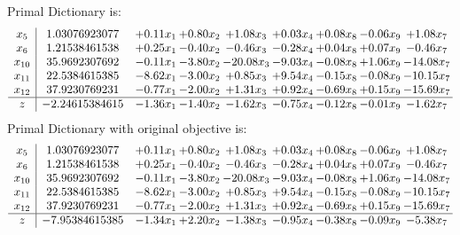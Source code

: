 \documentclass[9pt]{article}
\begin{document}
Primal Dictionary is:
\[\begin{array}{c| c c@{\hskip 2pt} c@{\hskip 2pt} c@{\hskip 2pt} c@{\hskip 2pt} c@{\hskip 2pt} c@{\hskip 2pt} c@{\hskip 2pt} }
 x_{5}   &  1.03076923077 & +  0.11 x_{1} & +  0.80 x_{2} & +  1.08 x_{3} & +  0.03 x_{4} & +  0.08 x_{8} & -0.06 x_{9} & +  1.08 x_{7}\\
 x_{6}   &  1.21538461538 & +  0.25 x_{1} & -0.40 x_{2} & -0.46 x_{3} & -0.28 x_{4} & +  0.04 x_{8} & +  0.07 x_{9} & -0.46 x_{7}\\
 x_{10}   &  35.9692307692 & -0.11 x_{1} & -3.80 x_{2} & -20.08 x_{3} & -9.03 x_{4} & -0.08 x_{8} & +  1.06 x_{9} & -14.08 x_{7}\\
 x_{11}   &  22.5384615385 & -8.62 x_{1} & -3.00 x_{2} & +  0.85 x_{3} & +  9.54 x_{4} & -0.15 x_{8} & -0.08 x_{9} & -10.15 x_{7}\\
 x_{12}   &  37.9230769231 & -0.77 x_{1} & -2.00 x_{2} & +  1.31 x_{3} & +  0.92 x_{4} & -0.69 x_{8} & +  0.15 x_{9} & -15.69 x_{7}\\
\hline
z    &  -2.24615384615 & -1.36 x_{1} & -1.40 x_{2} & -1.62 x_{3} & -0.75 x_{4} & -0.12 x_{8} & -0.01 x_{9} & -1.62 x_{7}\\
\end{array}\]
Primal Dictionary with original objective is:
\[\begin{array}{c| c c@{\hskip 2pt} c@{\hskip 2pt} c@{\hskip 2pt} c@{\hskip 2pt} c@{\hskip 2pt} c@{\hskip 2pt} c@{\hskip 2pt} }
 x_{5}   &  1.03076923077 & +  0.11 x_{1} & +  0.80 x_{2} & +  1.08 x_{3} & +  0.03 x_{4} & +  0.08 x_{8} & -0.06 x_{9} & +  1.08 x_{7}\\
 x_{6}   &  1.21538461538 & +  0.25 x_{1} & -0.40 x_{2} & -0.46 x_{3} & -0.28 x_{4} & +  0.04 x_{8} & +  0.07 x_{9} & -0.46 x_{7}\\
 x_{10}   &  35.9692307692 & -0.11 x_{1} & -3.80 x_{2} & -20.08 x_{3} & -9.03 x_{4} & -0.08 x_{8} & +  1.06 x_{9} & -14.08 x_{7}\\
 x_{11}   &  22.5384615385 & -8.62 x_{1} & -3.00 x_{2} & +  0.85 x_{3} & +  9.54 x_{4} & -0.15 x_{8} & -0.08 x_{9} & -10.15 x_{7}\\
 x_{12}   &  37.9230769231 & -0.77 x_{1} & -2.00 x_{2} & +  1.31 x_{3} & +  0.92 x_{4} & -0.69 x_{8} & +  0.15 x_{9} & -15.69 x_{7}\\
\hline
z    &  -7.95384615385 & -1.34 x_{1} & +  2.20 x_{2} & -1.38 x_{3} & -0.95 x_{4} & -0.38 x_{8} & -0.09 x_{9} & -5.38 x_{7}\\
\end{array}\]
\end{document}
